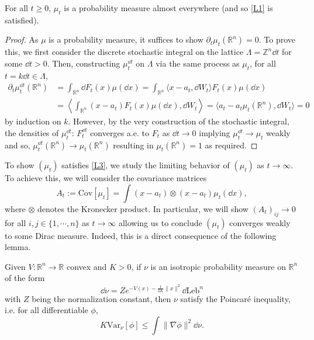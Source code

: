 \begin{proposition}
  For all \(t \ge 0\), \(\mu_t\) is a probability measure almost everywhere (and so \ref{L1} is satisfied).
\end{proposition}
\begin{proof}
  As \(\mu\) is a probability measure, it suffices to show \(\partial_t \mu_t(\mathbb{R}^n) = 0\).
  To prove this, we first consider the discrete stochastic integral on the lattice \(\Lambda = \mathbb{Z}^n \dd t\)
  for some \(\dd t > 0\). Then, constructing \(\mu_t^{\dd t}\) on \(\Lambda\) via the same process as \(\mu_t\),
  for all \(t = k \dd t \in \Lambda\),
  \begin{align*}
    \partial_t \mu_t^{\dd t}(\mathbb{R}^n) 
      & = \int_{\mathbb{R}^n} \dd F_t(x) \mu(\dd x) 
        = \int_{\mathbb{R}^n} \langle x - a_t, \dd W_t\rangle F_t(x) \mu(\dd x)\\
      & = \left\langle \int_{\mathbb{R}^n} (x - a_t) F_t(x)\mu(\dd x), \dd W_t \right\rangle
        = \langle a_t - a_t\mu_t(\mathbb{R}^n), \dd W_t \rangle = 0
  \end{align*}
  by induction on \(k\). However, by the very construction of the stochastic integral, the densities 
  of \(\mu_t^{\dd t}\): \(F_t^{\dd t}\) converges a.e. to \(F_t\) as \(\dd t \to 0\) implying 
  \(\mu_t^{\dd t} \to \mu_t\) weakly and so, \(\mu_t^{\dd t}(\mathbb{R}^n) \to \mu_t(\mathbb{R}^n)\)
  resulting in \(\mu_t(\mathbb{R}^n) = 1\) as required.
\end{proof}

To show \((\mu_t)\) satisfies \ref{L3}, we study the limiting behavior of \((\mu_t)\) as \(t \to \infty\). 
To achieve this, we will consider the covariance matrices
\begin{equation}
  A_t := \text{Cov}[\mu_t] = \int (x - a_t) \otimes (x - a_t) \mu_t(\dd x),
\end{equation}
where \(\otimes\) denotes the Kronecker product. In particular, we will show \((A_t)_{ij} \to 0\) for all
 \(i, j \in \{1, \cdots, n\}\) as \(t \to \infty\) allowing us to conclude \((\mu_t)\) converges weakly 
 to some Dirac measure. Indeed, this is a direct consequence of the following lemma.

\begin{lemma}\label{lem:brascamp-lieb}
  Given \(V : \mathbb{R}^n \to \mathbb{R}\) convex and \(K > 0\), if \(\nu\) is an isotropic probability 
  measure on \(\mathbb{R}^n\) of the form 
  \[\dd \nu = Ze^{-V(x) - \frac{1}{2K}\|x\|^2}\dd \text{Leb}^n\]
  with \(Z\) being the normalization constant, then \(\nu\) satisfy the Poincaré inequality, i.e. 
  for all differentiable \(\phi\),
  \[K\text{Var}_\nu[\phi] \le \int \|\nabla\phi\|^2 \dd\nu.\]
\end{lemma}


